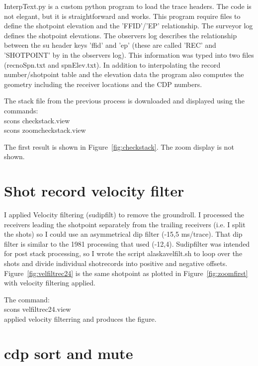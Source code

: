 InterpText.py is a custom python program to load the trace headers.  The
code is not elegant, but it is straightforward and works.  This program 
require files to define the shotpoint elevation and the 'FFID'/'EP' 
relationship.  The surveyor log defines the shotpoint elevations.  The 
observers log describes the relationship between the su header keys 
'ffid' and 'ep' (these are called 'REC' and 'SHOTPOINT' by in the observers 
log).  This information was typed into two files (recnoSpn.txt and 
spnElev.txt).  In addition to interpolating the record number/shotpoint 
table and the elevation data the program also computes the geometry 
including the receiver locations and the CDP numbers.

The stack file from the previous process is downloaded and displayed 
using the commands: \\
scons checkstack.view \\
scons zoomcheckstack.view

The first result is shown in Figure~\ref{fig:checkstack}.  The zoom display
is not shown.


\section{Shot record velocity filter}
I applied Velocity filtering (sudipfilt) to remove the groundroll.
I processed the receivers leading the shotpoint separately from the
trailing receivers (i.e. I split the shots) so I could use an 
asymmetrical dip filter (-15,5 ms/trace).  That dip filter is similar 
to the 1981 processing that used (-12,4). Sudipfilter was intended for post
stack processing, so I wrote the script alaskavelfilt.sh to loop over the 
shots and divide individual shotrecords into positive and negative offsets.  
Figure~\ref{fig:velfiltrec24} is the same shotpoint as plotted in 
Figure~\ref{fig:zoomfirst} with velocity filtering applied.

The command:\\
scons velfiltrec24.view \\
applied velocity filterring and produces the figure.


\section{cdp sort and mute}

